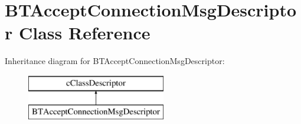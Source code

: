 \hypertarget{classBTAcceptConnectionMsgDescriptor}{}\section{B\+T\+Accept\+Connection\+Msg\+Descriptor Class Reference}
\label{classBTAcceptConnectionMsgDescriptor}
Inheritance diagram for B\+T\+Accept\+Connection\+Msg\+Descriptor\+:\begin{figure}[H]
\begin{center}
\leavevmode
\includegraphics[height=2.000000cm]{classBTAcceptConnectionMsgDescriptor}
\end{center}
\end{figure}
